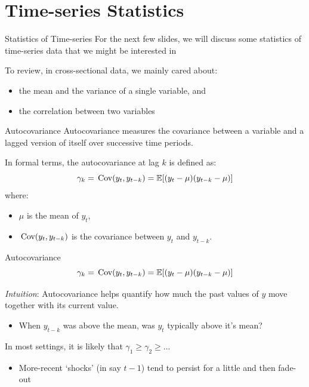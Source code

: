 \documentclass[aspectratio=169,t,11pt,table]{beamer}
\begin{document}






\section{Time-series Statistics}

\begin{frame}{Statistics of Time-series}
  For the next few slides, we will discuss some \alert{statistics} of time-series data that we might be interested in

  \bigskip
  To review, in cross-sectional data, we mainly cared about:
  \begin{itemize}
    \item the \alert{mean} and the \alert{variance} of a single variable, and
    \item the \alert{correlation} between two variables
  \end{itemize}
\end{frame}

\begin{frame}{Autocovariance}
  \alert{Autocovariance} measures the covariance between a variable and a lagged version of itself over successive time periods.

  \bigskip
  In formal terms, the autocovariance at lag $k$ is defined as:
  $$
    \gamma_k = \cov{y_t, y_{t-k}} = \expec{(y_t - \mu)(y_{t-k} - \mu)}
  $$
  where:
  \begin{itemize}
    \item $\mu$ is the mean of $y_t$,
    \item $\cov{y_t, y_{t-k}}$ is the covariance between $y_t$ and $y_{t-k}$.
  \end{itemize}
\end{frame}

\begin{frame}{Autocovariance}
  \vspace*{-\bigskipamount}
  $$
    \gamma_k = \cov{y_t, y_{t-k}} = \expec{(y_t - \mu)(y_{t-k} - \mu)}
  $$

  \bigskip
  \emph{Intuition}: Autocovariance helps quantify how much the past values of $y$ move together with its current value.
  \begin{itemize}
    \item When $y_{t-k}$ was above the mean, was $y_t$ typically above it's mean?
  \end{itemize}

  \bigskip
  \pause
  In most settings, it is likely that $\gamma_1 \geq \gamma_2 \geq \dots$
  \begin{itemize}
    \item More-recent `shocks' (in say $t-1$) tend to persist for a little and then fade-out
  \end{itemize}
\end{frame}
\end{document}
